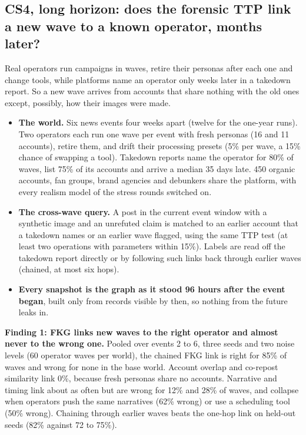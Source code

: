 \documentclass[11pt]{article}
\begin{document}
\subsection*{CS4, long horizon: does the forensic TTP link a new wave to a known operator, months later?}
Real operators run campaigns in waves, retire their personas after each one and change tools, while platforms name an operator only weeks later in a takedown report. So a new wave arrives from accounts that share nothing with the old ones except, possibly, how their images were made.

\begin{itemize}
\item \textbf{The world.} Six news events four weeks apart (twelve for the one-year runs). Two operators each run one wave per event with fresh personas (16 and 11 accounts), retire them, and drift their processing presets (5\% per wave, a 15\% chance of swapping a tool). Takedown reports name the operator for 80\% of waves, list 75\% of its accounts and arrive a median 35 days late. 450 organic accounts, fan groups, brand agencies and debunkers share the platform, with every realism model of the stress rounds switched on.
\item \textbf{The cross-wave query.} A post in the current event window with a synthetic image and an unrefuted claim is matched to an earlier account that a takedown names or an earlier wave flagged, using the same TTP test (at least two operations with parameters within 15\%). Labels are read off the takedown report directly or by following such links back through earlier waves (chained, at most six hops).
\item \textbf{Every snapshot is the graph as it stood 96 hours after the event began}, built only from records visible by then, so nothing from the future leaks in.
\end{itemize}

\textbf{Finding 1: FKG links new waves to the right operator and almost never to the wrong one.} Pooled over events 2 to 6, three seeds and two noise levels (60 operator waves per world), the chained FKG link is right for 85\% of waves and wrong for none in the base world. Account overlap and co-repost similarity link 0\%, because fresh personas share no accounts. Narrative and timing link about as often but are wrong for 12\% and 28\% of waves, and collapse when operators push the same narratives (62\% wrong) or use a scheduling tool (50\% wrong). Chaining through earlier waves beats the one-hop link on held-out seeds (82\% against 72 to 75\%).
\end{document}
